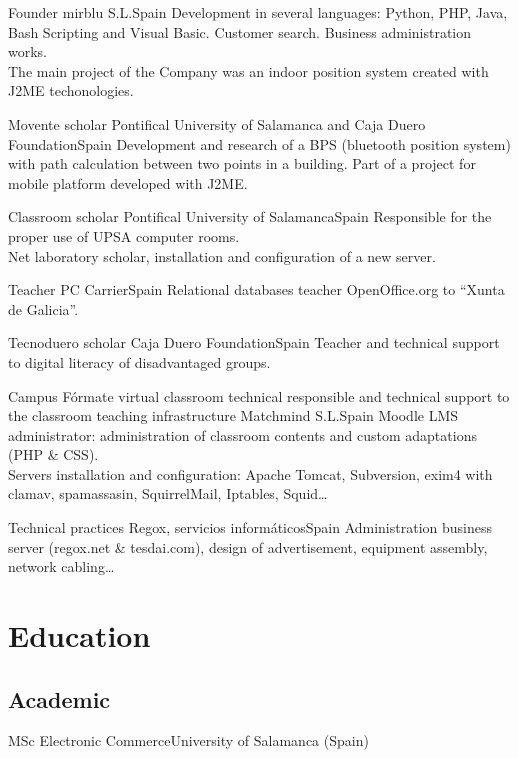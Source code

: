 \documentclass[10pt, a4paper]{moderncv}
\begin{document}
{Founder}
{mirblu S.L.}{Spain}{}
{Development in several languages: Python, PHP, Java, Bash Scripting and Visual
Basic. Customer search. Business administration works.\\The main project of the
Company was an indoor position system created with J2ME techonologies.}

{Movente scholar}
{Pontifical University of Salamanca and Caja Duero Foundation}{Spain}{}
{Development and research of a BPS (bluetooth position system) with path
calculation between two points in a building. Part of a project for mobile
platform developed with J2ME.}

{Classroom scholar}
{Pontifical University of Salamanca}{Spain}{}
{Responsible for the proper use of UPSA computer rooms.\\Net laboratory
scholar, installation and configuration of a new server.}

{Teacher}
{PC Carrier}{Spain}{}
{Relational databases teacher OpenOffice.org to ``Xunta de Galicia''.}

{Tecnoduero scholar}
{Caja Duero Foundation}{Spain}{}
{Teacher and technical support to digital literacy of disadvantaged groups.}

{Campus Fórmate virtual classroom technical responsible and technical support
to the classroom teaching infrastructure}
{Matchmind S.L.}{Spain}{}
{Moodle LMS administrator: administration of classroom contents and custom
adaptations (PHP \& CSS). \\ Servers installation and configuration: Apache
Tomcat, Subversion, exim4 with clamav, spamassasin, SquirrelMail, Iptables,
Squid\ldots}

{Technical practices}
{Regox, servicios informáticos}{Spain}{}
{Administration business server (regox.net \& tesdai.com), design of
advertisement, equipment assembly, network cabling\ldots}


%
%

\section{Education}
\subsection{Academic}
{MSc Electronic Commerce}{University of Salamanca (Spain)}{}{}{}
\end{document}
